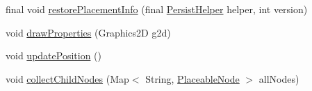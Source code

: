 \begin{DoxyCompactItemize}
\item 
final void \hyperlink{classorg_1_1tzi_1_1use_1_1gui_1_1views_1_1diagrams_1_1elements_1_1edges_1_1_edge_base_a088b4e51ff46832122f208d93e3f7c91}{restore\-Placement\-Info} (final \hyperlink{classorg_1_1tzi_1_1use_1_1gui_1_1util_1_1_persist_helper}{Persist\-Helper} helper, int version)
\item 
void \hyperlink{classorg_1_1tzi_1_1use_1_1gui_1_1views_1_1diagrams_1_1elements_1_1edges_1_1_edge_base_ac00da65a9869a33b10b0bf36a171042b}{draw\-Properties} (Graphics2\-D g2d)
\item 
void \hyperlink{classorg_1_1tzi_1_1use_1_1gui_1_1views_1_1diagrams_1_1elements_1_1edges_1_1_edge_base_afeddac45633a5ceefa76ee272c02b35c}{update\-Position} ()
\item 
void \hyperlink{classorg_1_1tzi_1_1use_1_1gui_1_1views_1_1diagrams_1_1elements_1_1edges_1_1_edge_base_a8c90619a9bc043091bc88857ca616b35}{collect\-Child\-Nodes} (Map$<$ String, \hyperlink{classorg_1_1tzi_1_1use_1_1gui_1_1views_1_1diagrams_1_1elements_1_1_placeable_node}{Placeable\-Node} $>$ all\-Nodes)
\end{DoxyCompactItemize}
